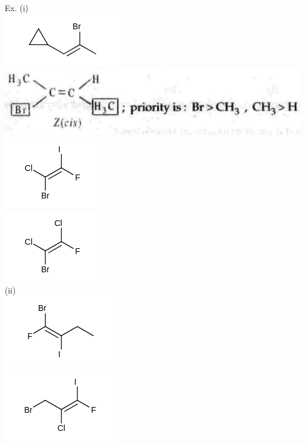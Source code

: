 \documentclass[10pt]{article}
\begin{document}
Ex. (i)\\
\includegraphics{smile-d045badcae6d40a8c788d29d234f1fb1b3af4227}\\
\includegraphics[max width=\textwidth, center]{2025_01_28_8470952b98110cec3aabg-046(1)}\\
\includegraphics{smile-6462741fa6c712cc329b974145bd325a3b49c749}\\
\includegraphics{smile-95324cfdc1e5d70b3f47f00d8a3f022c6f687ebe}\\
(ii)\\
\includegraphics{smile-261934cb0b03910aa6dcd3faa1ff45df3ba0f32e}\\
\includegraphics{smile-5bb6bf9090668f9b05688419986191ae79111b6c}
\end{document}
